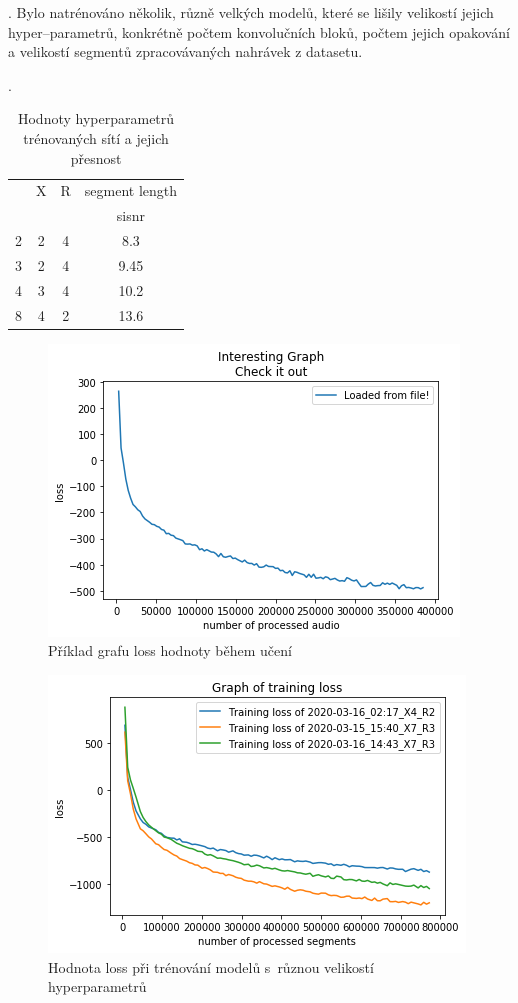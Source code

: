 .
Bylo natrénováno několik, různě velkých modelů, které se lišily velikostí jejich hyper--parametrů, konkrétně počtem konvolučních bloků, počtem jejich opakování a velikostí segmentů zpracovávaných nahrávek z datasetu. 

.

\begin{table}[hbt]
\centering
\caption{Hodnoty hyperparametrů trénovaných sítí a jejich přesnost}
\label{hodnoty}
\begin{tabular}{|l|c|c|c|}
\hline
 & X & R & segment length  \\
 &  &  & sisnr  \\ \hline
2 & 2 & 4 & 8.3 \\ \hline
3 & 2 & 4& 9.45 \\ \hline
4 & 3 & 4 & 10.2 \\ \hline
8 & 4 & 2 & 13.6 \\ \hline
\end{tabular}
\end{table}


\begin{figure}[H]
    \centering
    \includegraphics[scale=0.55]{obrazky-figures/some-loss.png}
    \caption{\label{fig:somelossTODO}Příklad grafu loss hodnoty během učení}
\end{figure}

\begin{figure}[H]
    \centering
    \includegraphics[scale=0.55]{obrazky-figures/loss_triple.png}
    \caption{\label{fig:somelossTODO2}Hodnota loss při trénování modelů s~různou velikostí hyperparametrů}
\end{figure}



